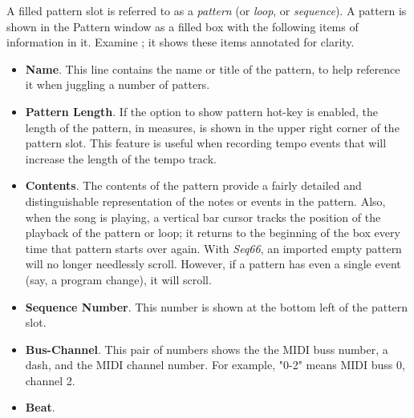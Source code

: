    A filled pattern slot is referred to as a \textsl{pattern}
   (or \textsl{loop}, or \textsl{sequence}).
   A pattern is shown in the Pattern window as a filled box with the
   following items of information in it.
   Examine ; it shows
   these items annotated for clarity.

   \begin{itemize}
      \item \textbf{Name}.
         This line contains the name or title of the pattern, to help
         reference it when juggling a number of patters.
      \item \textbf{Pattern Length}.
         If the option to show pattern hot-key is enabled, the length of the
         pattern, in measures, is shown in the upper right corner of the
         pattern slot.  This feature is useful when recording tempo events that
         will increase the length of the tempo track.
      \item \textbf{Contents}.
         The contents of the pattern provide a fairly detailed and
         distinguishable representation of the notes or events in the
         pattern.  Also, when the song is playing, a vertical bar cursor
         tracks the position of the playback of the pattern or loop; it
         returns to the beginning of the box every time that pattern starts
         over again.
         With \textsl{Seq66}, an imported empty pattern will no longer
         needlessly scroll.
         However, if a pattern has even a single event (say, a program change),
         it will scroll.
      \item \textbf{Sequence Number}.
         This number is shown at the bottom left of the pattern slot.
      \item \textbf{Bus-Channel}.
         This pair of numbers shows the the MIDI buss number, a dash, and
         the MIDI channel number.
         For example, "0-2" means MIDI buss 0, channel 2.
      \item \textbf{Beat}.

\end{itemize}
